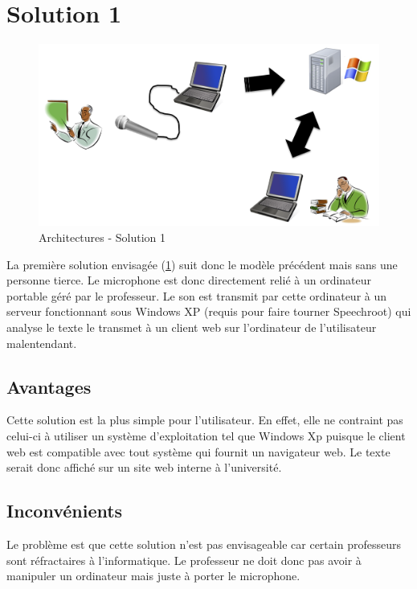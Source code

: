 \section{Solution 1}


\begin{figure}[h]
 \centering
 \includegraphics[scale=0.5]{./img/solution1.png}
 \caption{Architectures - Solution 1}
 \label{fig:solution1}
\end{figure}



La première solution envisagée (\ref{fig:solution1}) suit donc le modèle précédent mais sans une personne tierce.
Le microphone est donc directement relié à un ordinateur portable géré par le professeur.
Le son est transmit par cette ordinateur à un serveur fonctionnant sous Windows XP (requis pour faire tourner Speechroot) qui analyse le texte le transmet à un client web sur l'ordinateur de l'utilisateur malentendant.

\subsection{Avantages}
Cette solution est la plus simple pour l'utilisateur. En effet, elle ne contraint pas celui-ci à utiliser un système d'exploitation tel que Windows Xp puisque le client web est compatible avec tout système qui fournit un navigateur web. Le texte serait donc affiché sur un site web interne à l'université.

\subsection{Inconvénients}
Le problème est que cette solution n'est pas envisageable car certain professeurs sont ré\-frac\-tai\-res à l'informatique. Le professeur ne doit donc pas avoir à manipuler un ordinateur mais juste à porter le microphone.


